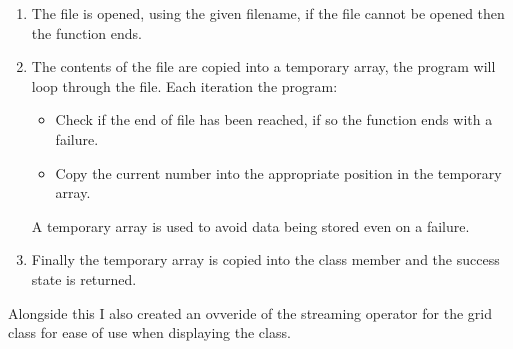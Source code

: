         \begin{enumerate}
            \item The file is opened, using the given filename, 
                if the file cannot be opened then the function ends.

            \item The contents of the file are copied into a temporary array, 
                the program will loop through the file. Each iteration the program:
                \begin{itemize}
                    \item Check if the end of file has been reached, 
                        if so the function ends with a failure.

                    \item Copy the current number into the appropriate position in the temporary array.
                \end{itemize}
                A temporary array is used to avoid data being stored even on a failure.
                
            \item Finally the temporary array is copied into the class member and the success state is returned.
        \end{enumerate}

        Alongside this I also created an ovveride of the streaming operator for the grid
        class for ease of use when displaying the class.
